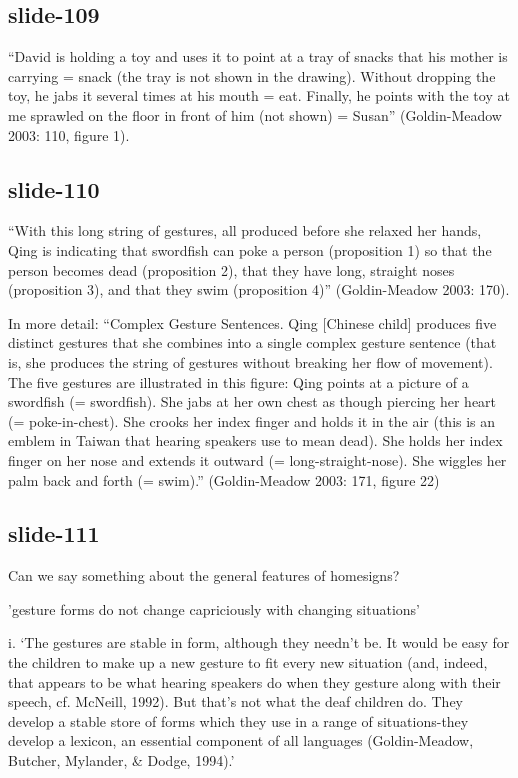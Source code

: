 \documentclass[12pt,\papersize]{extarticle}
\begin{document}
\subsection{slide-109}
“David is holding a toy and uses it to point at a tray of snacks that his mother is carrying = snack (the tray is not shown in the drawing). Without dropping the toy, he jabs it several times at his mouth = eat.  Finally, he points with the toy at me sprawled on the floor in front of him (not shown) = Susan” (Goldin-Meadow 2003: 110, figure 1).
 
\subsection{slide-110}
“With this long string of gestures, all produced before she relaxed her hands, Qing is indicating that swordfish can poke a person (proposition 1) so that the person becomes dead (proposition 2), that they have long, straight noses (proposition 3), and that they swim (proposition 4)” (Goldin-Meadow 2003: 170).
 
In more detail: “Complex Gesture Sentences.  Qing [Chinese child] produces five distinct gestures that she combines into a single complex gesture sentence (that is, she produces the string of gestures without breaking her flow of movement). The five gestures are illustrated in this figure: Qing points at a picture of a swordfish (= swordfish). She jabs at her own chest as though piercing her heart (= poke-in-chest). She crooks her index finger and holds it in the air (this is an emblem in Taiwan that hearing speakers use to mean dead). She holds her index finger on her nose and extends it outward (= long-straight-nose). She wiggles her palm back and forth (= swim).” (Goldin-Meadow 2003: 171, figure 22)
 
\subsection{slide-111}
Can we say something about the general features of homesigns?
 
'gesture forms do not change capriciously with changing situations'
 
i.	‘The gestures are stable in form, although they needn’t be. It would be easy for the children to make up a new gesture to fit every new situation (and, indeed, that appears to be what hearing speakers do when they gesture along with their speech, cf. McNeill, 1992). But that’s not what the deaf children do.  They develop a stable store of forms which they use in a range of situations-they develop a lexicon, an essential component of all languages (Goldin-Meadow, Butcher, Mylander, \& Dodge, 1994).’ \citep[p.\ 1389]{Goldin-Meadow:2002dq}
 
\end{document}
